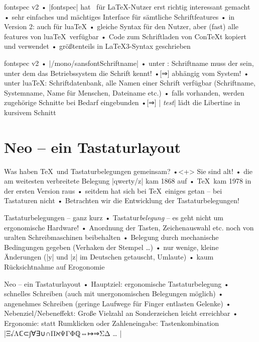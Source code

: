 \documentclass[t]{beamer}
\begin{document}
\begin{frame}[fragile]{fontspec v2}
• |fontspec| hat \XeTeX\ für \LaTeX-Nutzer erst richtig interessant gemacht
• sehr einfaches und mächtiges Interface für sämtliche Schriftfeatures\pause
• in Version 2: auch für lua\TeX
• gleiche Syntax für den Nutzer, aber (fast) alle features von lua\TeX\ verfügbar
• Code zum Schriftladen von Con\TeX t kopiert und verwendet
• größtenteils in \LaTeX3-Syntax geschrieben
\•
\end{frame}

\begin{frame}[fragile]{fontspec v2}
• |\setmain/mono/sansfont{Schriftname}|
• unter \XeTeX: Schriftname muss der sein, unter dem das Betriebssystem die Schrift kennt!
•[⇒] abhängig vom System!
• unter lua\TeX: Schriftdatenbank, alle Namen einer Schrift verfügbar (Schriftname, Systemname, Name für Menschen, Dateiname etc.)
• falls vorhanden, werden zugehörige Schnitte bei Bedarf eingebunden
•[⇒] | \textit{test}| lädt die Libertine in kursivem Schnitt
\•
\end{frame}

\section{Neo – ein Tastaturlayout}
\begin{frame}{Was haben \TeX\ und Tastaturbelegungen gemeinsam?}
•<+> Sie sind alt!
• die am weitesten verbreitete Belegung |qwerty/z| kam 1868 auf
• \TeX\ kam 1978 in der ersten Version raus
• seitdem hat sich bei \TeX\ einiges getan – bei Tastaturen nicht
• Betrachten wir die Entwicklung der Tastaturbelegungen!
\•
\end{frame}

\begin{frame}{Tastaturbelegungen – ganz kurz}
• Tastatur\emph{belegung} – es geht nicht um ergonomische Hardware!
• Anordnung der Tasten, Zeichenauswahl etc. noch von uralten Schreibmaschinen beibehalten
• Belegung durch mechanische Bedingungen gegeben (Verhaken der Stempel …)
• nur wenige, kleine Änderungen (|y| und |z| im Deutschen getauscht, Umlaute)
• kaum Rücksichtnahme auf Erogonomie
\•
\end{frame}

\begin{frame}[fragile]{Neo – ein Tastaturlayout}
• Hauptziel: ergonomische Tastaturbelegung
• schnelles Schreiben (auch mit unergonomischen Belegungen möglich)
• angenehmes Schreiben (geringe Laufwege für Finger entlasten Gelenke)\pause
• Nebenziel/Nebeneffekt: Große Vielzahl an Sonderzeichen leicht erreichbar
• Ergonomie: statt Rumklicken oder Zahleneingabe: Tastenkombination\\%
|Ξ√Λℂ⊂∫∀∃∪∩ΠℵΨΓΦℚ⇔↦⇒ΣΔ … |
\•
\end{frame}
\end{document}
